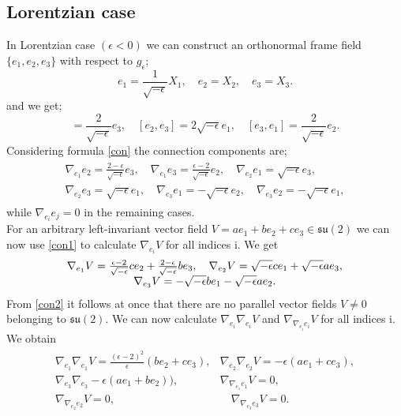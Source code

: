\documentclass[11pt,oneside,leqno]{amsart}
\theoremstyle{plain}
\begin{document}
\subsection{Lorentzian case}
In Lorentzian case $(\epsilon<0)$ we can construct an orthonormal frame field $\lbrace e_1,e_2,e_3\rbrace$ with respect to $g_\epsilon$;
\begin{equation}\label{base}
e_1=\frac{1}{\sqrt{-\epsilon}}X_1,\quad e_2=X_2,\quad e_3=X_3.
\end{equation}
and we get;
\begin{equation}
 [e_1,e_2]=\frac{2}{\sqrt{-\epsilon}}e_3,\quad [e_2,e_3]=2\sqrt{-\epsilon} e_1,\quad  [e_3,e_1]=\frac{2}{\sqrt{-\epsilon}}e_2.
 \end{equation}
Considering formula \eqref{con} the connection components are;
\begin{eqnarray}\label{con1}
\begin{array}{cr}
\nabla_{e_1}e_2=\frac{2-\epsilon}{\sqrt{-\epsilon}}e_3,\quad \nabla_{e_1}e_3=\frac{\epsilon-2}{\sqrt{-\epsilon}}e_2,\quad \nabla_{e_2}e_1=\sqrt{-\epsilon}e_3,\\
\nabla_{e_2}e_3=\sqrt{-\epsilon}e_1,\quad \nabla_{e_3}e_1=-\sqrt{-\epsilon}e_2,\quad \nabla_{e_3}e_2=-\sqrt{-\epsilon}e_1,
\end{array}
\end{eqnarray}
while $\nabla_{e_i}e_j=0$ in the remaining cases.\\
For an arbitrary left-invariant vector field $V =ae_1+be_2+ce_3 \in {{\mathfrak{su}}}(2)$ we can now use \eqref{con1}  to calculate $\nabla_{e_i}V$ for all indices i. We get
\begin{eqnarray}\label{con2}
\begin{array}{cr}
\nabla_{e_1}V=\frac{\epsilon-2}{\sqrt{-\epsilon}}ce_2+\frac{2-\epsilon}{\sqrt{-\epsilon}}be_3,\quad\nabla_{e_2}V=\sqrt{-\epsilon}ce_1+\sqrt{-\epsilon}ae_3,\\
\hspace*{0mm}\nabla_{e_3}V=-\sqrt{-\epsilon}be_1-\sqrt{-\epsilon}ae_2.
\end{array}
\end{eqnarray}
From \eqref{con2} it follows at once that there are no parallel vector fields $V\neq 0$ belonging to ${{\mathfrak{su}}}(2)$.
We can now calculate $\nabla_{e_i}\nabla_{e_i}V$ and $\nabla_{\nabla_{e_i}e_i}V$ for all indices i. We obtain
\begin{eqnarray}
\begin{array}{cc}\label{con3}
\nabla_{e_1}\nabla_{e_1}V=\frac{(\epsilon-2)^2}{\epsilon}(be_2+ce_3),& \nabla_{e_2}\nabla_{e_2}V=-\epsilon(ae_1+ce_3),\\
\nabla_{e_3}\nabla_{e_3}-\epsilon(ae_1+be_2)),&
\nabla_{\nabla_{e_1}e_1}V=0,\\
\nabla_{\nabla_{e_2}e_2}V=0,&\quad\nabla_{\nabla_{e_3}e_3}V=0.
\end{array}
\end{eqnarray}
\end{document}
